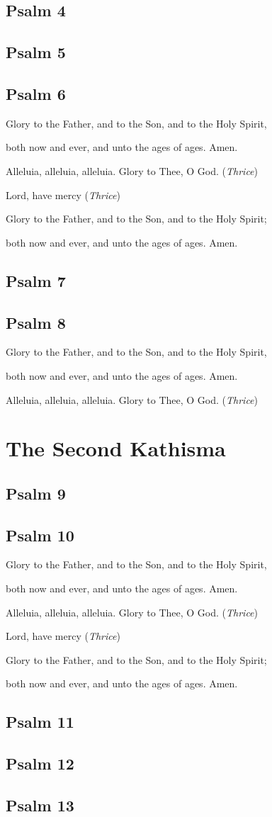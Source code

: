 \documentclass[12pt,openany]{book}
\newcommand{\kathismabreak}{
  \medskip
  \begin{center}
  \begin{footnotesize}
  Glory to the Father, and to the Son, and to the Holy Spirit,
  
  both now and ever, and unto the ages of ages. Amen.

  Alleluia, alleluia, alleluia. Glory to Thee, O God. (\textit{Thrice})

  Lord, have mercy (\textit{Thrice})

  Glory to the Father, and to the Son, and to the Holy Spirit;
  
  both now and ever, and unto the ages of ages. Amen.
  \end{footnotesize}
  \end{center}
  \smallbreak
}
\newcommand{\kathismaend}{
  \medskip
  \begin{center}
  \begin{footnotesize}
  Glory to the Father, and to the Son, and to the Holy Spirit,
  
  both now and ever, and unto the ages of ages. Amen.

  Alleluia, alleluia, alleluia. Glory to Thee, O God. (\textit{Thrice})
  \end{footnotesize}
  \end{center}
  \smallbreak
}
\begin{document}
\section{Psalm 4}

\smallskip
\section{Psalm 5}

\smallskip
\section{Psalm 6}


\kathismabreak
\smallskip

\section{Psalm 7}

\smallskip
\section{Psalm 8}


\kathismaend

\chapter*{The Second Kathisma}
\smallskip
\section{Psalm 9}

\smallskip
\section{Psalm 10}


\kathismabreak
\smallskip
\pagebreak %

\section{Psalm 11}

\smallskip
\section{Psalm 12}

\smallskip
\section{Psalm 13}

\end{document}
